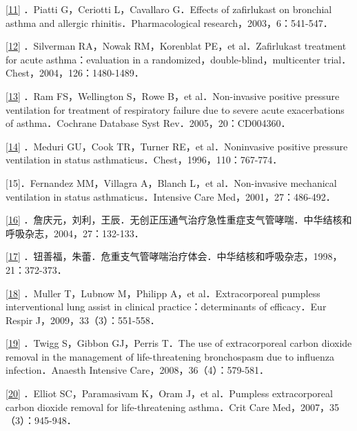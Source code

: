 \protect\hyperlink{text00013.htmlux5cux23ch11-12-back}{{[}11{]}}
．Piatti G，Ceriotti L，Cavallaro G．Effects of zafirlukast on bronchial
asthma and allergic rhinitis．Pharmacological
research，2003，6：541-547．

\protect\hyperlink{text00013.htmlux5cux23ch12-12-back}{{[}12{]}}
．Silverman RA，Nowak RM，Korenblat PE，et al．Zafirlukast treatment for
acute asthma：evaluation in a randomized，double-blind，multicenter
trial．Chest，2004，126：1480-1489．

\protect\hyperlink{text00013.htmlux5cux23ch13-12-back}{{[}13{]}} ．Ram
FS，Wellington S，Rowe B，et al．Non-invasive positive pressure
ventilation for treatment of respiratory failure due to severe acute
exacerbations of asthma．Cochrane Database Syst
Rev．2005，20：CD004360．

\protect\hyperlink{text00013.htmlux5cux23ch14-12-back}{{[}14{]}}
．Meduri GU，Cook TR，Turner RE，et al．Noninvasive positive pressure
ventilation in status asthmaticus．Chest，1996，110：767-774．

{[}15{]}．Fernandez MM，Villagra A，Blanch L，et al．Non-invasive
mechanical ventilation in status asthmaticus．Intensive Care
Med，2001，27：486-492．

\protect\hyperlink{text00013.htmlux5cux23ch16-12-back}{{[}16{]}}
．詹庆元，刘利，王辰．无创正压通气治疗急性重症支气管哮喘．中华结核和呼吸杂志，2004，27：132-133．

\protect\hyperlink{text00013.htmlux5cux23ch17-12-back}{{[}17{]}}
．钮善福，朱蕾．危重支气管哮喘治疗体会．中华结核和呼吸杂志，1998，21：372-373．

\protect\hyperlink{text00013.htmlux5cux23ch18-12-back}{{[}18{]}}
．Muller T，Lubnow M，Philipp A，et al．Extracorporeal pumpless
interventional lung assist in clinical practice：determinants of
efficacy．Eur Respir J，2009，33（3）：551-558．

\protect\hyperlink{text00013.htmlux5cux23ch19-12-back}{{[}19{]}} ．Twigg
S，Gibbon GJ，Perris T．The use of extracorporeal carbon dioxide removal
in the management of life-threatening bronchospasm due to influenza
infection．Anaesth Intensive Care，2008，36（4）：579-581．

\protect\hyperlink{text00013.htmlux5cux23ch20-12-back}{{[}20{]}}
．Elliot SC，Paramasivam K，Oram J，et al．Pumpless extracorporeal
carbon dioxide removal for life-threatening asthma．Crit Care
Med，2007，35（3）：945-948．

\protect\hypertarget{text00014.html}{}{}

